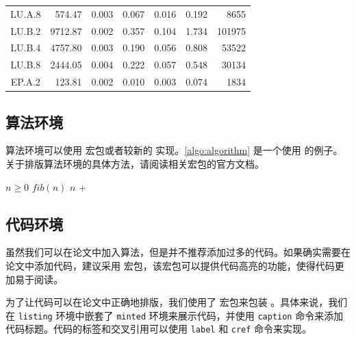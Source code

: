 \begin{ThreePartTable}
\begin{longtable}[c]{c*{6}{r}}
    LU.A.8                 & 574.47                              & 0.003                               & 0.067          & 0.016 & 0.192 & 8655   \\
    LU.B.2                 & 9712.87                             & 0.002                               & 0.357          & 0.104 & 1.734 & 101975 \\
    LU.B.4                 & 4757.80                             & 0.003                               & 0.190          & 0.056 & 0.808 & 53522  \\
    LU.B.8                 & 2444.05                             & 0.004                               & 0.222          & 0.057 & 0.548 & 30134  \\
    EP.A.2                 & 123.81                              & 0.002                               & 0.010          & 0.003 & 0.074 & 1834   \\
    \bottomrule
  \end{longtable}
\end{ThreePartTable}

\subsection{算法环境}

算法环境可以使用  宏包或者较新的  实现。\cref{algo:algorithm} 是一个使用  的例子。关于排版算法环境的具体方法，请阅读相关宏包的官方文档。

\begin{algorithm}
  \caption{计算斐波那契数列}\label{algo:algorithm}
  \begin{algorithmic}[1]
    \Require $n \geq 0$
    \Ensure $fib(n)$
    \State \Return $n$
    \Else
    \State \Return {} + 
    \EndIf
    \EndFunction
  \end{algorithmic}
\end{algorithm}

\subsection{代码环境}

虽然我们可以在论文中加入算法，但是并不推荐添加过多的代码。如果确实需要在论文中添加代码，建议采用  宏包，该宏包可以提供代码高亮的功能，使得代码更加易于阅读。

为了让代码可以在论文中正确地排版，我们使用了  宏包来包装 。具体来说，我们在 \texttt{listing} 环境中嵌套了 \texttt{minted} 环境来展示代码，并使用 \texttt{caption} 命令来添加代码标题。代码的标签和交叉引用可以使用 \texttt{label} 和 \texttt{cref} 命令来实现。

